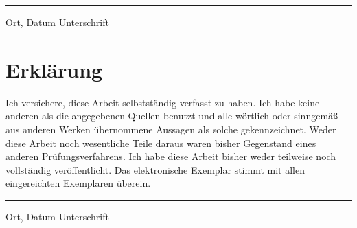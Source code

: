\documentclass[conference,compsoc,ngerman]{IEEEtran}
\begin{document}
\vspace{4cm}

\hrule
\vspace{0.2cm}
Ort, Datum \hfill Unterschrift \hspace{2cm}


%
%
%

\clearpage

\onecolumn
\section*{Erklärung}

Ich versichere, diese Arbeit selbstständig verfasst zu haben.
Ich habe keine anderen als die angegebenen Quellen benutzt und alle wörtlich oder sinngemäß aus anderen Werken übernommene Aussagen als solche gekennzeichnet.
Weder diese Arbeit noch wesentliche Teile daraus waren bisher Gegenstand eines anderen Prüfungsverfahrens.
Ich habe diese Arbeit bisher weder teilweise noch vollständig veröffentlicht.
Das elektronische Exemplar stimmt mit allen eingereichten Exemplaren überein.

\vspace{4cm}

\hrule
\vspace{0.2cm}
Ort, Datum \hfill Unterschrift \hspace{2cm}
\end{document}
